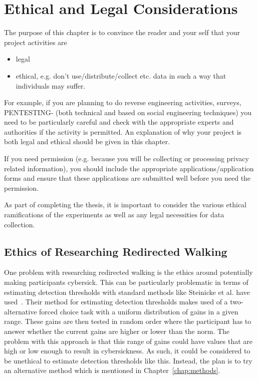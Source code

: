 \chapter{Ethical and Legal Considerations} \label{chap:ethics}

The purpose of this chapter is to convince the
reader and your self that your project activities are
\begin{itemize}
\item legal
\item ethical, e.g. don't use/distribute/collect etc. data in such a way that individuals may suffer.
\end{itemize}
For example, if you are planning to do reverse engineering activities, surveys, PENTESTING- (both technical and based on social engineering techniques) you need to be particularly careful and check with the appropriate experts and authorities if the activity is permitted.  An explanation of why your project is both legal and ethical should be given in this chapter.

If you need permission (e.g. because you will be collecting or processing privacy related information), 
you should  include the appropriate applications/application forms and ensure that these applications 
are submitted well before you need the permission.
\fi

As part of completing the thesis, it is important to consider the various ethical ramifications of the experiments as well as any legal necessities for data collection.

\section{Ethics of Researching Redirected Walking}
One problem with researching redirected walking is the ethics around potentially making participants cybersick. This can be particularly problematic in terms of estimating detection thresholds with standard methods like Steinicke et al. have used~\cite{5072212}. Their method for estimating detection thresholds makes used of a two-alternative forced choice task with a uniform distribution of gains in a given range. These gains are then tested in random order where the participant has to answer whether the current gains are higher or lower than the norm. The problem with this approach is that this range of gains could have values that are high or low enough to result in cybersickness. As such, it could be considered to be unethical to estimate detection thresholds like this. Instead, the plan is to try an alternative method which is mentioned in Chapter~\ref{chap:methods}. 

